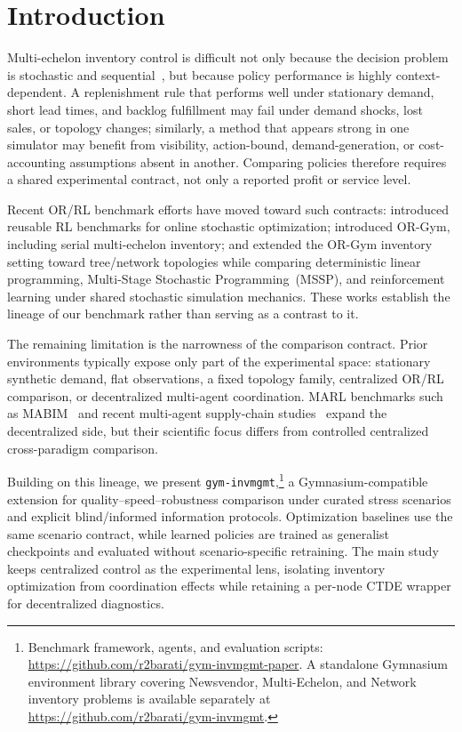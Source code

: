\documentclass[10pt,a4paper]{article}
\begin{document}
\section{Introduction}\label{sec:intro}

Multi-echelon inventory control is difficult not only because the decision
problem is stochastic and sequential~\citep{clark1960,zipkin2000}, but because
policy performance is highly context-dependent. A replenishment rule that
performs well under stationary demand, short lead times, and backlog
fulfillment may fail under demand shocks, lost sales, or topology changes;
similarly, a method that appears strong in one simulator may benefit from
visibility, action-bound, demand-generation, or cost-accounting assumptions
absent in another. Comparing policies therefore requires a shared experimental
contract, not only a reported profit or service level.

Recent OR/RL benchmark efforts have moved toward such contracts:
\citet{balaji2020} introduced reusable RL benchmarks for online stochastic
optimization; \citet{hubbs2020} introduced OR-Gym, including serial
multi-echelon inventory; and \citet{perez2021} extended the OR-Gym inventory
setting toward tree/network topologies while comparing deterministic linear
programming, Multi-Stage Stochastic Programming~(MSSP), and reinforcement
learning under shared stochastic simulation mechanics. These works establish
the lineage of our benchmark rather than serving as a contrast to it.

The remaining limitation is the narrowness of the comparison contract. Prior
environments typically expose only part of the experimental space: stationary
synthetic demand, flat observations, a fixed topology family, centralized
OR/RL comparison, or decentralized multi-agent coordination. MARL benchmarks
such as MABIM~\citep{liu2023mabim} and recent multi-agent supply-chain
studies~\citep{kotecha2025,quan2024} expand the decentralized side, but their
scientific focus differs from controlled centralized cross-paradigm
comparison.

Building on this lineage, we present \texttt{gym-invmgmt},\footnote{Benchmark framework, agents, and evaluation scripts:
\url{https://github.com/r2barati/gym-invmgmt-paper}.  A standalone Gymnasium
environment library covering Newsvendor, Multi-Echelon, and Network
inventory problems is available separately at
\url{https://github.com/r2barati/gym-invmgmt}.} a
Gymnasium-compatible extension for quality--speed--robustness comparison
under curated stress scenarios and explicit blind/informed information
protocols. Optimization baselines use the same scenario contract, while
learned policies are trained as generalist checkpoints and evaluated without
scenario-specific retraining. The main study keeps centralized control as the
experimental lens, isolating inventory optimization from coordination effects
while retaining a per-node CTDE wrapper for decentralized diagnostics.
\end{document}
